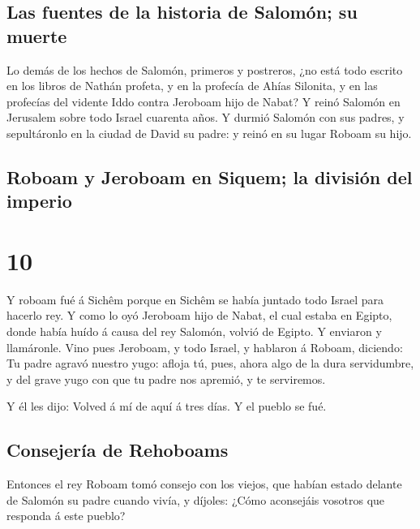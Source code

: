 \hypertarget{las-fuentes-de-la-historia-de-salomuxf3n-su-muerte}{%
\subsection{Las fuentes de la historia de Salomón; su
muerte}\label{las-fuentes-de-la-historia-de-salomuxf3n-su-muerte}}

 Lo demás de los hechos de Salomón, primeros y postreros,
¿no está todo escrito en los libros de Nathán profeta, y en la profecía
de Ahías Silonita, y en las profecías del vidente Iddo contra Jeroboam
hijo de Nabat?  Y reinó Salomón en Jerusalem sobre todo
Israel cuarenta años.  Y durmió Salomón con sus padres, y
sepultáronlo en la ciudad de David su padre: y reinó en su lugar Roboam
su hijo.

\hypertarget{roboam-y-jeroboam-en-siquem-la-divisiuxf3n-del-imperio}{%
\subsection{Roboam y Jeroboam en Siquem; la división del
imperio}\label{roboam-y-jeroboam-en-siquem-la-divisiuxf3n-del-imperio}}

\hypertarget{section-9}{%
\section{10}\label{section-9}}

 Y roboam fué á Sichêm porque en Sichêm se había juntado
todo Israel para hacerlo rey.  Y como lo oyó Jeroboam hijo
de Nabat, el cual estaba en Egipto, donde había huído á causa del rey
Salomón, volvió de Egipto.  Y enviaron y llamáronle. Vino
pues Jeroboam, y todo Israel, y hablaron á Roboam, diciendo:
 Tu padre agravó nuestro yugo: afloja tú, pues, ahora algo
de la dura servidumbre, y del grave yugo con que tu padre nos apremió, y
te serviremos.

 Y él les dijo: Volved á mí de aquí á tres días. Y el pueblo
se fué.

\hypertarget{consejeruxeda-de-rehoboams}{%
\subsection{Consejería de Rehoboams}\label{consejeruxeda-de-rehoboams}}

 Entonces el rey Roboam tomó consejo con los viejos, que
habían estado delante de Salomón su padre cuando vivía, y díjoles: ¿Cómo
aconsejáis vosotros que responda á este pueblo?

